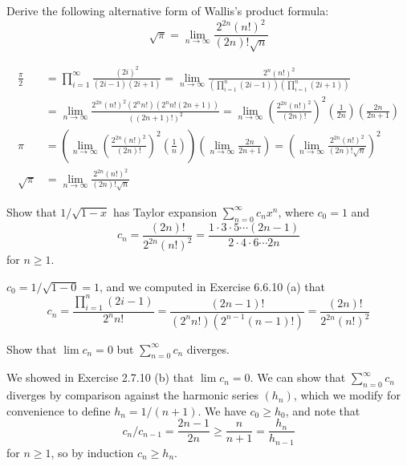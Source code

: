 \begin{exercise}
Derive the following alternative form of Wallis's product formula:
\[\sqrt{\pi} = \lim_{n \to \infty} \frac{2^{2n} (n!)^2}{(2n)! \sqrt{n}}\]
\end{exercise}
\begin{solution}
\[ \begin{aligned}
    \frac{\pi}{2} &= \prod^\infty_{i=1} \frac{(2i)^2}{(2i-1)(2i+1)} = \lim_{n \to \infty} \frac{2^n (n!)^2}{\left(\prod^n_{i=1} (2i-1)\right)\left(\prod^n_{i=1} (2i + 1) \right)} \\
    &= \lim_{n \to \infty} \frac{2^{2n} (n!)^2 (2^n n!) \left(2^n n! (2n + 1)\right)}{\left((2n+1)!\right)^2} = \lim_{n \to \infty} \left(\frac{2^{2n} (n!)^2}{(2n)!}\right)^2 \left(\frac{1}{2n}\right)\left(\frac{2n}{2n+1}\right) \\
    \pi &= \left(\lim_{n \to \infty} \left(\frac{2^{2n} (n!)^2}{(2n)!}\right)^2 \left(\frac{1}{n}\right) \right) \left( \lim_{n \to \infty}\frac{2n}{2n+1}\right) =\left(\lim_{n \to \infty} \frac{2^{2n} (n!)^2}{(2n)! \sqrt{n}}\right)^2  \\
\sqrt{\pi} &= \lim_{n \to \infty} \frac{2^{2n} (n!)^2}{(2n)! \sqrt{n}}
\end{aligned}
   \]
\end{solution}

\begin{exercise}
Show that \(1 / \sqrt{1-x}\) has Taylor expansion \(\sum^\infty_{n=0} c_n x^n\), where \(c_0 = 1\) and
\[c_n = \frac{(2n)!}{2^{2n} (n!)^2} = \frac{1 \cdot 3 \cdot 5 \cdots (2n-1)}{ 2 \cdot 4 \cdot 6 \cdots 2n}\]
for \(n \geq 1\).
\end{exercise}
\begin{solution}
\(c_0 = 1 / \sqrt{1-0} = 1\), and we computed in Exercise 6.6.10 (a) that
\[c_n = \frac{\prod^n_{i=1} (2i - 1)}{2^n n!} = \frac{(2n-1)!}{\left(2^n n!\right)\left( 2^{n-1} (n-1)!\right)} =\frac{(2n)!}{2^{2n} (n!)^2} \]
\end{solution}

\begin{exercise}
Show that \(\lim c_n = 0\) but \(\sum^\infty_{n=0} c_n \) diverges.
\end{exercise}
\begin{solution}
We showed in Exercise 2.7.10 (b) that \(\lim c_n = 0\).  We can show that \(\sum_{n=0}^\infty c_n\) diverges by comparison against the harmonic series \((h_n)\), which we modify for convenience to define \(h_n = 1 / (n+1)\). We have \(c_0 \geq h_0\), and note that
\[c_n / c_{n-1} = \frac{2n-1}{2n} \geq \frac{n}{n+1} = \frac{h_n}{h_{n-1}}\]
for \(n \geq 1\), so by induction \(c_n \geq h_n\).
\end{solution}

